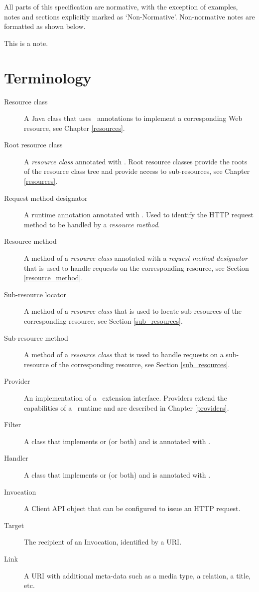 All parts of this specification are normative, with the exception of examples, notes and sections explicitly marked as `Non-Normative'. Non-normative notes are formatted as shown below.

\begin{nnnote*}
This is a note.
\end{nnnote*}

\section{Terminology}

\begin{description}
\item[Resource class] A Java class that uses \jaxrs\ annotations to implement a corresponding Web resource, see Chapter \ref{resources}.
\item[Root resource class] A {\em resource class} annotated with \Path. Root resource classes provide the roots of the resource class tree and provide access to sub-resources, see Chapter \ref{resources}.
\item[Request method designator] A runtime annotation annotated with \HttpMethod. Used to identify the HTTP request method to be handled by a {\em resource method}.
\item[Resource method] A method of a {\em resource class} annotated with a {\em request method designator} that is used to handle requests on the corresponding resource, see Section \ref{resource_method}.
\item[Sub-resource locator] A method of a {\em resource class} that is used to locate sub-resources of the corresponding resource, see Section \ref{sub_resources}.
\item[Sub-resource method] A method of a {\em resource class} that is used to handle requests on a sub-resource of the corresponding resource, see Section \ref{sub_resources}.
\item[Provider] An implementation of a \jaxrs\ extension interface. Providers extend the capabilities of a \jaxrs\ runtime and are described in Chapter \ref{providers}.
\item[Filter] A class that implements  or  (or both) and is annotated with \Provider.
\item[Handler] A class that implements  or  (or both) and is annotated with \Provider.
\item[Invocation] A Client API object that can be configured to issue an HTTP request.
\item[Target] The recipient of an Invocation, identified by a URI.
\item[Link] A URI with additional meta-data such as a media type, a relation, a title, etc.

\end{description}

